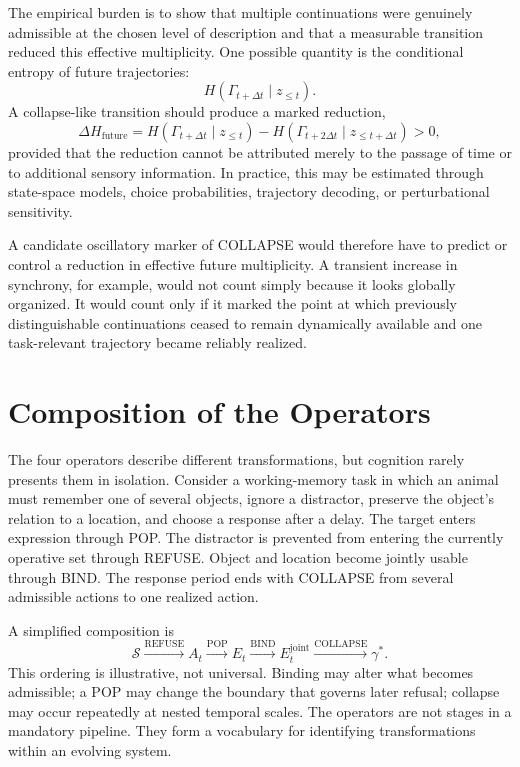 \documentclass[11pt]{book}
\begin{document}
The empirical burden is to show that multiple continuations were genuinely admissible at the chosen level of description and that a measurable transition reduced this effective multiplicity. One possible quantity is the conditional entropy of future trajectories:
\[
H\!\left(\Gamma_{t+\Delta t}\mid z_{\leq t}\right).
\]
A collapse-like transition should produce a marked reduction,
\[
\Delta H_{\mathrm{future}}
=
H\!\left(\Gamma_{t+\Delta t}\mid z_{\leq t}\right)
-
H\!\left(\Gamma_{t+2\Delta t}\mid z_{\leq t+\Delta t}\right)
>0,
\]
provided that the reduction cannot be attributed merely to the passage of time or to additional sensory information. In practice, this may be estimated through state-space models, choice probabilities, trajectory decoding, or perturbational sensitivity.

A candidate oscillatory marker of COLLAPSE would therefore have to predict or control a reduction in effective future multiplicity. A transient increase in synchrony, for example, would not count simply because it looks globally organized. It would count only if it marked the point at which previously distinguishable continuations ceased to remain dynamically available and one task-relevant trajectory became reliably realized.

\section*{Composition of the Operators}

The four operators describe different transformations, but cognition rarely presents them in isolation. Consider a working-memory task in which an animal must remember one of several objects, ignore a distractor, preserve the object's relation to a location, and choose a response after a delay. The target enters expression through POP. The distractor is prevented from entering the currently operative set through REFUSE. Object and location become jointly usable through BIND. The response period ends with COLLAPSE from several admissible actions to one realized action.

A simplified composition is
\[
\mathcal S
\xrightarrow{\operatorname{REFUSE}}
A_t
\xrightarrow{\operatorname{POP}}
E_t
\xrightarrow{\operatorname{BIND}}
E_t^{\mathrm{joint}}
\xrightarrow{\operatorname{COLLAPSE}}
\gamma^{*}.
\]
This ordering is illustrative, not universal. Binding may alter what becomes admissible; a POP may change the boundary that governs later refusal; collapse may occur repeatedly at nested temporal scales. The operators are not stages in a mandatory pipeline. They form a vocabulary for identifying transformations within an evolving system.
\end{document}
